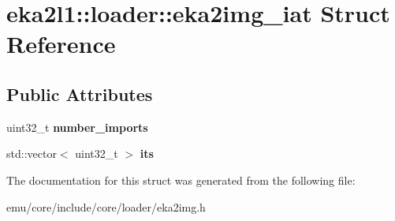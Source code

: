 \hypertarget{structeka2l1_1_1loader_1_1eka2img__iat}{}\section{eka2l1\+:\+:loader\+:\+:eka2img\+\_\+iat Struct Reference}
\label{structeka2l1_1_1loader_1_1eka2img__iat}
\subsection*{Public Attributes}
\begin{DoxyCompactItemize}
\item 
\mbox{\label{structeka2l1_1_1loader_1_1eka2img__iat_ac880948dcb1f3eb1122f8ff1d0977fa2}} 
uint32\+\_\+t {\bfseries number\+\_\+imports}
\item 
\mbox{\label{structeka2l1_1_1loader_1_1eka2img__iat_a4089a86d9836549040b4169aee5f689b}} 
std\+::vector$<$ uint32\+\_\+t $>$ {\bfseries its}
\end{DoxyCompactItemize}


The documentation for this struct was generated from the following file\+:\begin{DoxyCompactItemize}
\item 
emu/core/include/core/loader/eka2img.\+h\end{DoxyCompactItemize}
